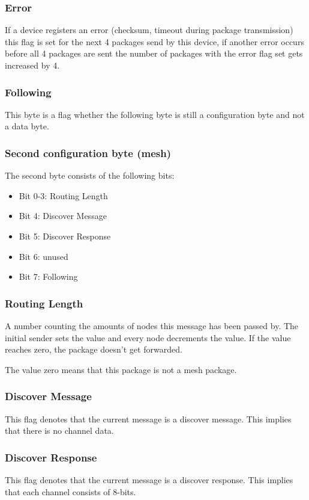 \documentclass{scrreprt}
\begin{document}
\subsubsection{Error}
If a device registers an error (checksum, timeout during package
transmission) this flag is set for the next 4 packages send by this device,
if another error occurs before all 4 packages are sent the number of packages with the error flag set 
gets increased by 4.

\subsubsection{Following}
This byte is a flag whether the following byte is still a configuration
byte and not a data byte.

\subsubsection{Second configuration byte (mesh)}
The second byte consists of the following bits:
\begin{itemize}
  \item Bit 0-3: Routing Length
  \item Bit 4: Discover Message
  \item Bit 5: Discover Response
  \item Bit 6: unused
  \item Bit 7: Following
\end{itemize}

\subsubsection{Routing Length}
A number counting the amounts of nodes this message has been passed by. The
initial sender sets the value and every node decrements the value. If the
value reaches zero, the package doesn't get forwarded.

The value zero means that this package is not a mesh package.

\subsubsection{Discover Message}
This flag denotes that the current message is a discover message. This implies that there is no
channel data.

\subsubsection{Discover Response}
This flag denotes that the current message is a discover response. This implies that each channel consists of 8-bits.
\end{document}
